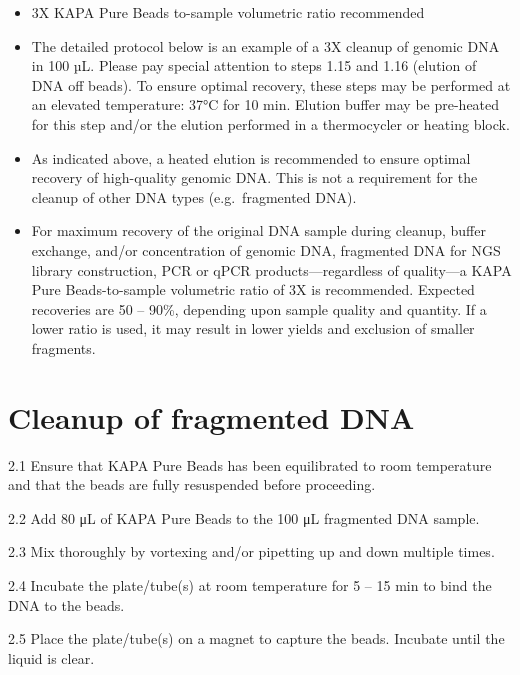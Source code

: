 \documentclass[
  letterpaper,
  DIV=11,
  numbers=noendperiod]{scrreprt}
\begin{document}
\begin{itemize}
\item
  3X KAPA Pure Beads to-sample volumetric ratio recommended
\item
  The detailed protocol below is an example of a 3X cleanup of genomic
  DNA in 100 µL. Please pay special attention to steps 1.15 and 1.16
  (elution of DNA off beads). To ensure optimal recovery, these steps
  may be performed at an elevated temperature: 37°C for 10 min. Elution
  buffer may be pre-heated for this step and/or the elution performed in
  a thermocycler or heating block.
\item
  As indicated above, a heated elution is recommended to ensure optimal
  recovery of high-quality genomic DNA. This is not a requirement for
  the cleanup of other DNA types (e.g.~fragmented DNA).
\item
  For maximum recovery of the original DNA sample during cleanup, buffer
  exchange, and/or concentration of genomic DNA, fragmented DNA for NGS
  library construction, PCR or qPCR products---regardless of quality---a
  KAPA Pure Beads-to-sample volumetric ratio of 3X is recommended.
  Expected recoveries are 50 -- 90\%, depending upon sample quality and
  quantity. If a lower ratio is used, it may result in lower yields and
  exclusion of smaller fragments.
\end{itemize}

\hypertarget{cleanup-of-fragmented-dna}{%
\section*{\texorpdfstring{\textbf{Cleanup of fragmented
DNA}}{Cleanup of fragmented DNA}}\label{cleanup-of-fragmented-dna}}


2.1 Ensure that KAPA Pure Beads has been equilibrated to room
temperature and that the beads are fully resuspended before proceeding.

2.2 Add 80 μL of KAPA Pure Beads to the 100 μL fragmented DNA sample.

2.3 Mix thoroughly by vortexing and/or pipetting up and down multiple
times.

2.4 Incubate the plate/tube(s) at room temperature for 5 -- 15 min to
bind the DNA to the beads.

2.5 Place the plate/tube(s) on a magnet to capture the beads. Incubate
until the liquid is clear.
\end{document}
